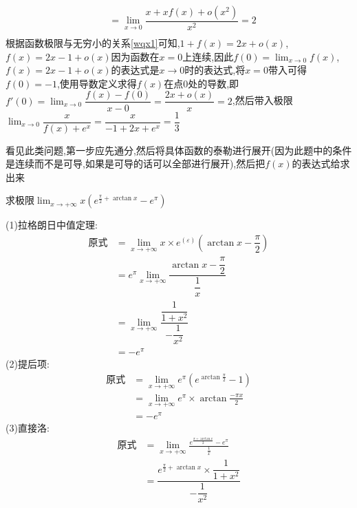 \documentclass[8pt a4paper, oneside, UTF8]{ctexbook}
\begin{document}
\begin{sloppypar}
\begin{solution}
\begin{equation*}
\begin{split}
                & = \lim_{x \to 0}\dfrac{x+xf(x)+o(x^2)}{x^2}=2 \\
            \end{split}
        \end{equation*}
        根据函数极限与无穷小的关系\ref{wqx1}可知,$1+f(x)=2x+o(x)$,$f(x)=2x-1+o(x)$因为函数在$x=0$上连续,因此$f(0)=\lim_{x\to 0}f(x)$,$f(x)=2x-1+o(x)$的表达式是$x\to 0$时的表达式,将$x=0$带入可得$f(0)=-1$,使用导数定义求得$f(x)$在点0处的导数,即$f'(0)=\lim_{x \to 0}\dfrac{f(x)-f(0)}{x-0}=\dfrac{2x+o(x)}{x}=2$,然后带入极限$\lim_{x\to 0}\dfrac{x}{f(x)+e^x}=\dfrac{x}{-1+2x+e^x}=\dfrac{1}{3}$
    \end{solution}
    \begin{note}
        看见此类问题,第一步应先通分,然后将具体函数的泰勒进行展开(因为此题中的条件是连续而不是可导,如果是可导的话可以全部进行展开),然后把$f(x)$的表达式给求出来
    \end{note}
    \begin{problem}
    求极限$\lim_{x\to +\infty}x(e^{\frac{\pi}{2}+\arctan x}-e^\pi)$
    \end{problem}
    \begin{solution}
        (1)拉格朗日中值定理:
        \begin{align*}
            \text{原式} & = \lim_{x\to +\infty}x\times e^{(\varepsilon)}(\arctan x -\dfrac{\pi}{2}) \\
                      & = e^{\pi} \lim_{x\to +\infty}\dfrac{\arctan x -\dfrac{\pi}{2}}{\dfrac1x}  \\
                      & =\lim_{x\to +\infty} \dfrac{\dfrac{1}{1+x^2}}{-\dfrac{1}{x^2}}            \\
                      & =-e^\pi
        \end{align*}
        (2)提后项:
        \begin{align*}
            \text{原式} & = \lim_{x\to +\infty}e^\pi(e^{\arctan \frac{\pi}{2}}-1) \\
                      & =\lim_{x\to +\infty}e^\pi\times\arctan \frac{-\pi x}{2} \\
                      & =-e^\pi
        \end{align*}
        (3)直接洛:
        \begin{align*}
            \text{原式} & = \lim_{x\to +\infty}\frac{e^{\frac{\pi+\arctan x}{2}}-e^\pi}{\frac{1}{x}}       \\
                      & = \dfrac{e^{\frac{\pi}{2}+\arctan x}\times\dfrac{1}{1+x^{2}}}{-\dfrac{1}{x^{2}}} \\

\end{align*}
\end{solution}
\end{sloppypar}
\end{document}
